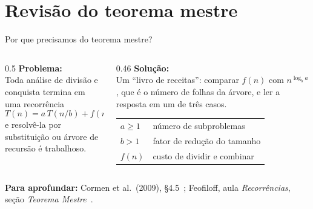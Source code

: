 \documentclass[aspectratio=169,xcolor=table]{beamer}
\newcommand{\fonte}[1]{%
  \vfill
  {\tiny\color{gray!55!black}\textbf{Para aprofundar:} #1\par}%
}
\begin{document}
\section{Revisão do teorema mestre}

\begin{frame}{Por que precisamos do teorema mestre?}
  \begin{columns}[T]
    \begin{column}{0.5\textwidth}
      \textbf{Problema:}\\[2pt]
      {\scriptsize Toda análise de divisão e conquista termina em uma
      recorrência
      \[ T(n)=a\,T(n/b)+f(n), \]
      e resolvê-la por substituição ou árvore de recursão é trabalhoso.}
    \end{column}
    \begin{column}{0.46\textwidth}
      \textbf{Solução:}\\[2pt]
      {\scriptsize Um ``livro de receitas'': comparar $f(n)$ com
      $n^{\log_b a}$, que é o número de folhas da árvore, e ler a resposta
      em um de três casos.}

      \medskip
      {\scriptsize
      \begin{tabular}{@{}ll@{}}
        $a\ge 1$ & número de subproblemas \\
        $b>1$    & fator de redução do tamanho \\
        $f(n)$   & custo de dividir e combinar
      \end{tabular}}
    \end{column}
  \end{columns}
  \fonte{Cormen et al.\ (2009), \S 4.5~\cite{cormen2009introduction};
    Feofiloff, aula \emph{Recorrências}, seção \emph{Teorema Mestre}~\cite{feofiloff2026analise}.}
\end{frame}
\end{document}
